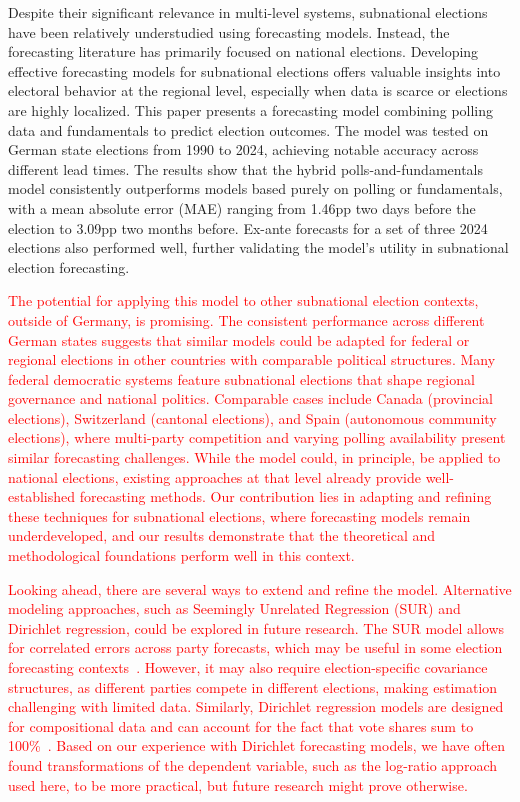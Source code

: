 \documentclass[12pt]{article}
\begin{document}
\begin{doublespacing}
Despite their significant relevance in multi-level systems, subnational elections have been relatively understudied using forecasting models. Instead, the forecasting literature has primarily focused on national elections. Developing effective forecasting models for subnational elections offers valuable insights into electoral behavior at the regional level, especially when data is scarce or elections are highly localized. This paper presents a forecasting model combining polling data and fundamentals to predict election outcomes. The model was tested on German state elections from 1990 to 2024, achieving notable accuracy across different lead times. The results show that the hybrid polls-and-fundamentals model consistently outperforms models based purely on polling or fundamentals, with a mean absolute error (MAE) ranging from 1.46pp two days before the election to 3.09pp two months before. Ex-ante forecasts for a set of three 2024 elections also performed well, further validating the model's utility in subnational election forecasting.

\textcolor{red}{The potential for applying this model to other subnational election contexts, outside of Germany, is promising. The consistent performance across different German states suggests that similar models could be adapted for federal or regional elections in other countries with comparable political structures. Many federal democratic systems feature subnational elections that shape regional governance and national politics. Comparable cases include Canada (provincial elections), Switzerland (cantonal elections), and Spain (autonomous community elections), where multi-party competition and varying polling availability present similar forecasting challenges. While the model could, in principle, be applied to national elections, existing approaches at that level already provide well-established forecasting methods. Our contribution lies in adapting and refining these techniques for subnational elections, where forecasting models remain underdeveloped, and our results demonstrate that the theoretical and methodological foundations perform well in this context.}

\textcolor{red}{Looking ahead, there are several ways to extend and refine the model. Alternative modeling approaches, such as Seemingly Unrelated Regression (SUR) and Dirichlet regression, could be explored in future research. The SUR model allows for correlated errors across party forecasts, which may be useful in some election forecasting contexts~\citep[see e.g.,][]{mongrain202110}. However, it may also require election-specific covariance structures, as different parties compete in different elections, making estimation challenging with limited data. Similarly, Dirichlet regression models are designed for compositional data and can account for the fact that vote shares sum to 100\%~\citep[see e.g.,][]{hanretty2021forecasting, Stoetzer_Neunhoeffer_Gschwend_Munzert_Sternberg_2019}. Based on our experience with Dirichlet forecasting models, we have often found transformations of the dependent variable, such as the log-ratio approach used here, to be more practical, but future research might prove otherwise.}


\end{doublespacing}
\end{document}
